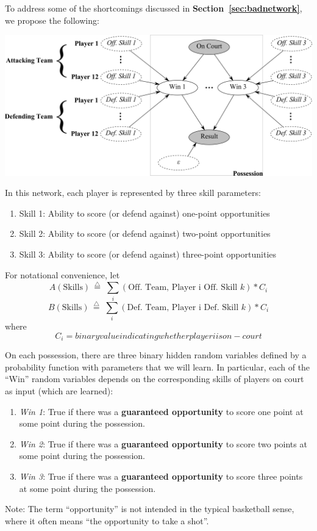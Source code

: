 \documentclass[10pt,twocolumn]{article}
\newcommand{\tridefeq}{\ensuremath{  \,{\overset{\triangle}{=}}\;   }}
\begin{document}
To address some of the shortcomings discussed in {\bf Section~\ref{sec:badnetwork}}, we propose the following:
\begin{center}
	\includegraphics[width=1.05\linewidth]{figures/newnetwork}
\end{center}

In this network, each player is represented by three skill parameters:
\begin{enumerate}
\item Skill 1: Ability to score (or defend against) one-point opportunities
\item Skill 2: Ability to score (or defend against) two-point opportunities
\item Skill 3: Ability to score (or defend against) three-point opportunities
\end{enumerate}

For notational convenience, let
\[
A\left(\mathrm{Skills}\right) \tridefeq \sum_i  \left( \textrm{Off. Team, Player i Off. Skill } k \right) * C_i
\]%
\[
B\left(\mathrm{Skills}\right) \tridefeq  \sum_i \left(  \textrm{Def. Team, Player i Def. Skill } k \right) * C_i
\]%
where
\[
C_i = binary value indicating whether player i is on-court
\]%

On each possession, there are three binary hidden random variables defined by a probability function with parameters that we will learn. In particular, each of the ``Win'' random variables depends on the corresponding skills of players on court as input (which are learned):
\begin{enumerate}
\item \emph{Win 1}: True if there was a {\bf guaranteed opportunity} to score one point at some point during the possession.
\item \emph{Win 2}: True if there was a {\bf guaranteed opportunity} to score two points at some point during the possession.
\item \emph{Win 3}: True if there was a {\bf guaranteed opportunity} to score three points at some point during the possession.
\end{enumerate}
Note: The term ``opportunity'' is not intended in the typical basketball sense, where it often means ``the opportunity to take a shot''.
\end{document}
